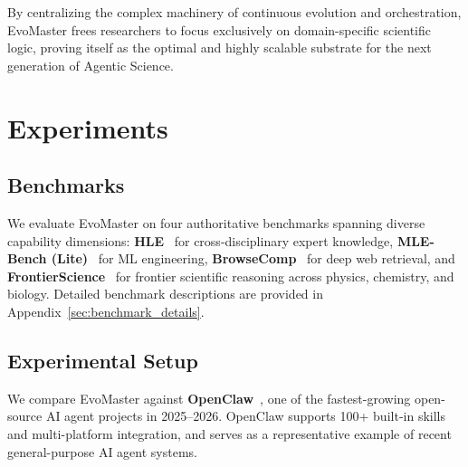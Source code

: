 \documentclass[11pt, a4paper, logo, copyright, nonumbering]{cls/Sci}
\begin{document}
By centralizing the complex machinery of continuous evolution and orchestration, EvoMaster frees researchers to focus exclusively on domain-specific scientific logic, proving itself as the optimal and highly scalable substrate for the next generation of Agentic Science.


\section{Experiments}
\label{sec:experiments}

\subsection{Benchmarks}

We evaluate EvoMaster on four authoritative benchmarks spanning diverse capability dimensions: \textbf{HLE}~\citep{hle2025} for cross-disciplinary expert knowledge, \textbf{MLE-Bench (Lite)}~\citep{chan2024mlebench} for ML engineering, \textbf{BrowseComp}~\citep{wei2025browsecomp} for deep web retrieval, and \textbf{FrontierScience}~\citep{openai2026frontierscience} for frontier scientific reasoning across physics, chemistry, and biology. Detailed benchmark descriptions are provided in Appendix~\ref{sec:benchmark_details}.

\subsection{Experimental Setup}

We compare EvoMaster against \textbf{OpenClaw}~\citep{steinberger2025openclaw}, one of the fastest-growing open-source AI agent projects in 2025--2026. OpenClaw supports 100+ built-in skills and multi-platform integration, and serves as a representative example of recent general-purpose AI agent systems.
\end{document}
